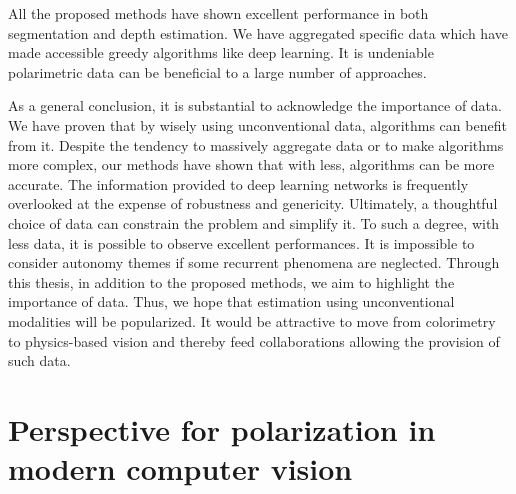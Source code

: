 All the proposed methods have shown excellent performance in both segmentation and depth estimation. We have aggregated specific data which have made accessible greedy algorithms like deep learning. It is undeniable polarimetric data can be beneficial to a large number of approaches.


As a general conclusion, it is substantial to acknowledge the importance of data. We have proven that by wisely using unconventional data, algorithms can benefit from it. Despite the tendency to massively aggregate data or to make algorithms more complex, our methods have shown that with less, algorithms can be more accurate. The information provided to deep learning networks is frequently overlooked at the expense of robustness and genericity. Ultimately, a thoughtful choice of data can constrain the problem and simplify it. To such a degree, with less data, it is possible to observe excellent performances. 
It is impossible to consider autonomy themes if some recurrent phenomena are neglected. Through this thesis, in addition to the proposed methods, we aim to highlight the importance of data. Thus, we hope that estimation using unconventional modalities will be popularized. It would be attractive to move from colorimetry to physics-based vision and thereby feed collaborations allowing the provision of such data.


\section{Perspective for polarization in modern computer vision}\label{polaper}

